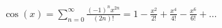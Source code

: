 \documentclass[preview]{standalone}
\begin{document}
\begin{align*}
\cos(x) = \sum_{n=0}^{\infty} \frac{(-1)^n x^{2n}}{(2n)!}  = 1 - \frac{x^2}{2!} + \frac{x^4}{4!} - \frac{x^6}{6!} + \dots
\end{align*}
\end{document}
